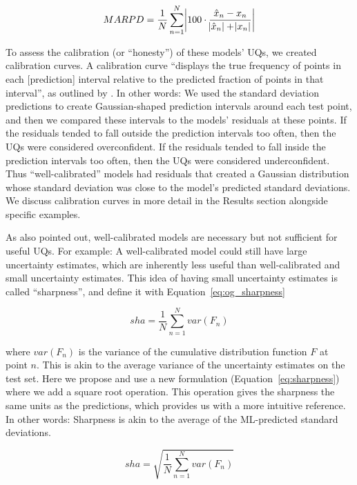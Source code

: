 \documentclass[]{achemso}
\begin{document}
\begin{equation}\label{eq:marpd}
    MARPD = \frac{1}{N} \sum_{n=1}^{N} \abs{100 \cdot \frac{\hat{x}_n - x_n}{\abs{\hat{x}_n} + \abs{x_n}}}
\end{equation}

To assess the calibration (or ``honesty'') of these models' UQs, we created calibration curves. A calibration curve ``displays the true frequency of points in each [prediction] interval relative to the predicted fraction of points in that interval'', as outlined by \citet{Kuleshov2018}.
In other words:  We used the standard deviation predictions to create Gaussian-shaped prediction intervals around each test point, and then we compared these intervals to the models' residuals at these points.
If the residuals tended to fall outside the prediction intervals too often, then the UQs were considered overconfident.
If the residuals tended to fall inside the prediction intervals too often, then the UQs were considered underconfident.
Thus ``well-calibrated'' models had residuals that created a Gaussian distribution whose standard deviation was close to the model's predicted standard deviations.
We discuss calibration curves in more detail in the Results section alongside specific examples.

As \citet{Kuleshov2018} also pointed out, well-calibrated models are necessary but not sufficient for useful UQs.
For example:  A well-calibrated model could still have large uncertainty estimates, which are inherently less useful than well-calibrated and small uncertainty estimates.
This idea of having small uncertainty estimates is called ``sharpness'', and \citet{Kuleshov2018} define it with Equation~\ref{eq:og_sharpness}

\begin{equation}\label{eq:og_sharpness}
    sha = \frac{1}{N} \sum_{n=1}^{N} var(F_n)
\end{equation}

\noindent where $var(F_n)$ is the variance of the cumulative distribution function $F$ at point $n$.
This is akin to the average variance of the uncertainty estimates on the test set.
Here we propose and use a new formulation (Equation~\ref{eq:sharpness}) where we add a square root operation.
This operation gives the sharpness the same units as the predictions, which provides us with a more intuitive reference.
In other words:  Sharpness is akin to the average of the \gls{ML}-predicted standard deviations.

\begin{equation}\label{eq:sharpness}
    sha = \sqrt{\frac{1}{N} \sum_{n=1}^{N} var(F_n)}
\end{equation}
\end{document}
